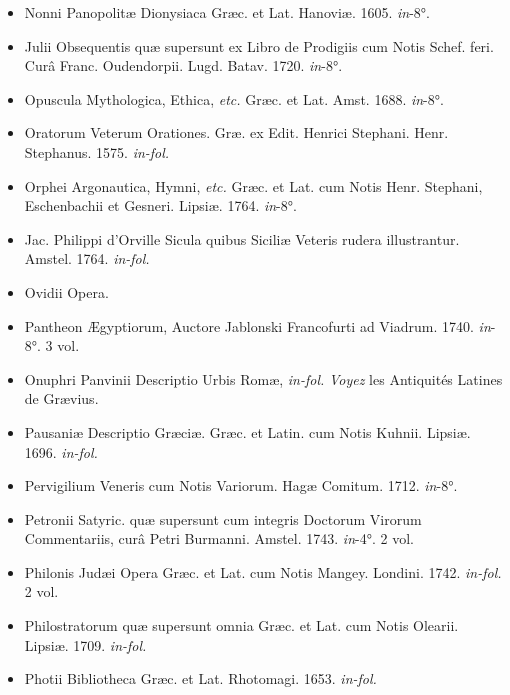 \documentclass[a4paper, 11pt, oneside, polutonikogreek, french]{article}
\begin{document}
\begin{itemize}
    \item Nonni Panopolitæ Dionysiaca Græc. et Lat. Hanoviæ. 1605. \emph{in}-8°.

    \item Julii Obsequentis quæ supersunt ex Libro de Prodigiis cum Notis Schef. feri. Curâ Franc. Oudendorpii. Lugd. Batav. 1720. \emph{in}-8°.

    \item Opuscula Mythologica, Ethica, \emph{etc.} Græc. et Lat. Amst. 1688. \emph{in}-8°.

    \item Oratorum Veterum Orationes. Græ. ex Edit. Henrici Stephani. Henr. Stephanus. 1575. \emph{in-fol.}

    \item Orphei Argonautica, Hymni, \emph{etc.} Græc. et Lat. cum Notis Henr. Stephani, Eschenbachii et Gesneri. Lipsiæ. 1764. \emph{in}-8°.

    \item Jac. Philippi d'Orville Sicula quibus Siciliæ Veteris rudera illustrantur. Amstel. 1764. \emph{in-fol.}

    \item Ovidii Opera.

    \item Pantheon Ægyptiorum, Auctore Jablonski Francofurti ad Viadrum. 1740. \emph{in}-8°. 3 vol.

    \item Onuphri Panvinii Descriptio Urbis Romæ, \emph{in-fol.} \emph{Voyez} les Antiquités Latines de Grævius.

    \item Pausaniæ Descriptio Græciæ. Græc. et Latin. cum Notis Kuhnii. Lipsiæ. 1696. \emph{in-fol.}

    \item Pervigilium Veneris cum Notis Variorum. Hagæ Comitum. 1712. \emph{in}-8°.

    \item Petronii Satyric. quæ supersunt cum integris Doctorum Virorum Commentariis, curâ Petri Burmanni. Amstel. 1743. \emph{in}-4°. 2 vol.

    \item Philonis Judæi Opera Græc. et Lat. cum Notis Mangey. Londini. 1742. \emph{in-fol.} 2 vol.

    \item Philostratorum quæ supersunt omnia Græc. et Lat. cum Notis Olearii. Lipsiæ. 1709. \emph{in-fol.}

    \item Photii Bibliotheca Græc. et Lat. Rhotomagi. 1653. \emph{in-fol.}


\end{itemize}
\end{document}
